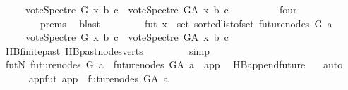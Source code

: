 \begin{isabellebody}
\ \ \ \ {\isasymLongrightarrow}\ vote{\isacharunderscore}{\kern0pt}Spectre\ G\ x\ b\ c\ {\isasymle}\ vote{\isacharunderscore}{\kern0pt}Spectre\ G{\isacharunderscore}{\kern0pt}A\ x\ b\ c{\isachardoublequoteclose}\ \isanewline
\ \ \ \ \ \ \isamarkupfalse%
\ {}{\isacharparenleft}{\kern0pt}{}{\isacharcomma}{\kern0pt}{}{\isacharparenright}{\kern0pt}\ four\isanewline
\ \ \ \ \ \ \ \ {\isachardoublequoteopen}{}{\isachardot}{\kern0pt}prems{\isachardoublequoteclose}{\isacharparenleft}{\kern0pt}{}{\isacharparenright}{\kern0pt}\ \isamarkupfalse%
\ blast\ \isanewline
\isanewline
\ \ \ \ \isamarkupfalse%
\ \isamarkupfalse%
\ fut{\isacharcolon}{\kern0pt}\ {\isachardoublequoteopen}{\isasymforall}x\ {\isasymin}\ set\ {\isacharparenleft}{\kern0pt}sorted{\isacharunderscore}{\kern0pt}list{\isacharunderscore}{\kern0pt}of{\isacharunderscore}{\kern0pt}set\ {\isacharparenleft}{\kern0pt}future{\isacharunderscore}{\kern0pt}nodes\ G\ a{\isacharparenright}{\kern0pt}{\isacharparenright}{\kern0pt}{\isachardot}{\kern0pt}\ \isanewline
\ \ \ \ \ {\isacharparenleft}{\kern0pt}vote{\isacharunderscore}{\kern0pt}Spectre\ G\ x\ b\ c{\isacharparenright}{\kern0pt}\ {\isasymle}\ {\isacharparenleft}{\kern0pt}vote{\isacharunderscore}{\kern0pt}Spectre\ G{\isacharunderscore}{\kern0pt}A\ x\ b\ c{\isacharparenright}{\kern0pt}{\isachardoublequoteclose}\isanewline
\ \ \ \ \ \ \isamarkupfalse%
\ HB{}{\isachardot}{\kern0pt}finite{\isacharunderscore}{\kern0pt}past\ HB{}{\isachardot}{\kern0pt}past{\isacharunderscore}{\kern0pt}nodes{\isacharunderscore}{\kern0pt}verts\ \isanewline
\ \ \ \ \ \ \isamarkupfalse%
\ simp\isanewline
\ \ \ \ \isamarkupfalse%
\ futN{\isacharcolon}{\kern0pt}\ {\isachardoublequoteopen}future{\isacharunderscore}{\kern0pt}nodes\ G\ a\ {\isacharequal}{\kern0pt}\ future{\isacharunderscore}{\kern0pt}nodes\ G{\isacharunderscore}{\kern0pt}A\ a\ {\isacharminus}{\kern0pt}\ {\isacharbraceleft}{\kern0pt}app{\isacharbraceright}{\kern0pt}{\isachardoublequoteclose}\ \isamarkupfalse%
\ HB{}{\isachardot}{\kern0pt}append{\isacharunderscore}{\kern0pt}future\ {}{\isacharparenleft}{\kern0pt}{}{\isacharparenright}{\kern0pt}\ \isamarkupfalse%
\ auto\ \isanewline
\ \ \ \ \isamarkupfalse%
\ appfut{\isacharcolon}{\kern0pt}\ {\isachardoublequoteopen}app\ {\isasymin}\ future{\isacharunderscore}{\kern0pt}nodes\ G{\isacharunderscore}{\kern0pt}A\ a{\isachardoublequoteclose}\ \isamarkupfalse%

\end{isabellebody}
